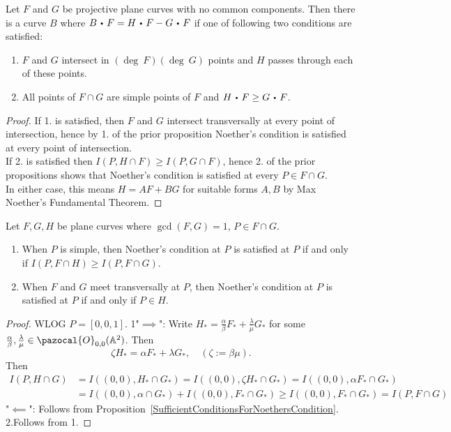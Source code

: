     \begin{corollary}\label{ExistenceOfSmallerSubCycle}
        Let $F$ and $G$ be projective plane curves with no common components. Then there is a curve $B$ where $B\ic F = H\ic F-G\ic F$ if one of following two conditions are satisfied:
        \begin{enumerate}
            \item $F$ and $G$ intersect in $(\deg \ F)(\deg\ G)$ points and $H$ passes through each of these points.
            \item All points of $F\cap G$ are simple points of $F$ and $H\ic F\geq G\ic F$.
        \end{enumerate}
    \end{corollary}
    \begin{proof}
        If 1. is satisfied, then $F$ and $G$ intersect transversally at every point of intersection, hence by 1. of the prior proposition Noether's condition is satisfied at every point of intersection.\\
        If 2. is satisfied then $I(P,H\cap F)\geq I(P,G\cap F)$, hence 2. of the prior propositions shows that Noether's condition is satisfied at every $P\in F\cap G$.\\
        In either case, this means $H=AF+BG$ for suitable forms $A,B$ by Max Noether's Fundamental Theorem.
    \end{proof}
    \begin{proposition}
        Let $F,G,H$ be plane curves where $\gcd(F,G)=1$, $P\in F\cap G$.
        \begin{enumerate}
            \item When $P$ is simple, then Noether's condition at $P$ is satisfied at $P$ if and only if $I(P,F\cap H)\geq I(P,F\cap G)$.
            \item When $F$ and $G$ meet transversally at $P$, then Noether's condition at $P$ is satisfied at $P$ if and only if $P\in H$. 
        \end{enumerate}
    \end{proposition}
    \begin{proof}
         WLOG $P=[0,0,1]$.
        1"$\implies$": Write $H_\ast = \frac{\alpha}{\beta}F_\ast+\frac{\lambda}{\mu}G_\ast$  for some $\frac{\alpha}{\beta},\frac{\lambda}{\mu}\in\pazocal{O}_{0,0}(\A^2)$. Then 
        $$\zeta H_\ast = \alpha F_\ast + \lambda G_\ast, \quad (\zeta := \beta\mu).$$
            Then 
        \begin{align*}
            I(P,H\cap G)&= I((0,0), H_\ast \cap G_\ast) = I((0,0), \zeta H_\ast\cap G_\ast) = I((0,0), \alpha F_\ast\cap G_\ast)\\
            &= I((0,0), \alpha \cap G_\ast) + I((0,0), F_\ast \cap G_\ast) \geq I((0,0), F_\ast\cap G_\ast) = I(P,F\cap G)
        \end{align*}
        "$\impliedby$": Follows from Proposition~\ref{SufficientConditionsForNoethersCondition}.\\
        2.Follows from 1. 
    \end{proof}

